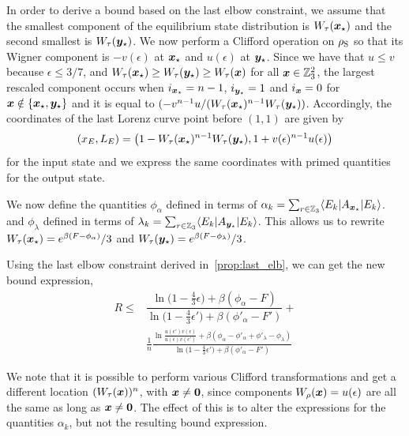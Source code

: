 \documentclass[pra,
aps,
twocolumn,
superscriptaddress,
groupedaddress,
nofootinbib,
reprint
]{revtex4-1}
\begin{document}
In order to derive a bound based on the last elbow constraint, we assume that the smallest component of the equilibrium state distribution is $W_{\tau}(\bm{x}_\star)$ and the second smallest is $W_{\tau}(\bm{y}_\star)$.
We now perform a Clifford operation on $\rho_{\rm{S}}$ so that its Wigner component is $-v(\epsilon)$ at $\bm{x}_\star$ and $u(\epsilon)$ at $\bm{y}_\star$. 
Since we have that $u \leq v$ because $\epsilon \leq 3/7$, and $W_{\tau}(\bm{x}_\star) \geq W_{\tau}(\bm{y}_\star) \geq W_{\tau}(\bm{x})$ for all $\bm{x} \in \mathbb{Z}_3^2$, the largest rescaled component occurs when $i_{\bm{x}_\star} = n-1$, $i_{\bm{y}_\star} = 1$ and $i_{\bm{x}} = 0$ for $\bm{x} \notin \{\bm{x}_\star, \bm{y}_\star\}$ and it is equal to $(-v^{n-1}u/(W_{\tau}(\bm{x}_\star)^{n-1}W_{\tau}(\bm{y}_\star))$.
Accordingly, the coordinates of the last Lorenz curve point before $(1,1)$ are given by
\begin{equation}
	(x_E, L_E) = \left( 1-W_{\tau}(\bm{x}_\star)^{n-1}W_{\tau}(\bm{y}_\star), 1 + v(\epsilon)^{n-1}u(\epsilon) \right)
\end{equation}
for the input state and we express the same coordinates with primed quantities for the output state.

We now define the quantities $\phi_\alpha$ defined in terms of $\alpha_k = \sum_{r \in \mathbb{Z}_3} \langle E_k |A_{\bm{x}_\star} |E_k\rangle$. and $\phi_\lambda$ defined in terms of $\lambda_k = \sum_{r \in \mathbb{Z}_3} \langle E_k |A_{\bm{y}_\star} |E_k\rangle$.
This allows us to rewrite $W_{\tau}(\bm{x}_\star) = {e^{\beta (F - \phi_\alpha)}}/{3}$ and $W_{\tau}(\bm{y}_\star) = {e^{\beta (F - \phi_\lambda)}}/{3}$.

Using the last elbow constraint derived in~\cref{prop:last_elb}, we can get the new bound expression,
\begin{equation}
	\begin{split}
	R \leq &\dfrac{\ln{\big( 1-\frac{4}{3}\epsilon \big)} + \beta (\phi_\alpha - F)}{\ln{\big( 1-\frac{4}{3}\epsilon' \big)} + \beta (\phi'_\alpha - F')} + \\
	&\frac{1}{n}\frac{\ln{\frac{u(\epsilon')v(\epsilon)}{u(\epsilon)v(\epsilon')}}+\beta(\phi_\alpha - \phi'_\alpha + \phi'_\lambda - \phi_\lambda)}{\ln{\big( 1-\frac{4}{3}\epsilon' \big)} + \beta (\phi'_\alpha - F')}
	\end{split}
\end{equation}

We note that it is possible to perform various Clifford transformations and get a different location $(W_{\tau}(\bm{x}))^n$, with $\bm{x} \neq \bm{0}$, since components $W_{\rho}(\bm{x}) = u(\epsilon)$ are all the same as long as $\bm{x} \neq \bm{0}$.
The effect of this is to alter the expressions for the quantities $\alpha_k$, but not the resulting bound expression.
\end{document}
